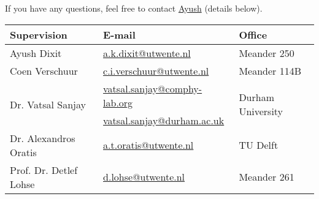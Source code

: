 \documentclass[a4paper,10pt]{article}
\begin{document}
If you have any questions, feel free to contact \href{mailto:a.k.dixit@utwente.nl}{Ayush} (details below).
\begin{center}
\begin{tabular}{|l|l|l|}
\hline \textbf{Supervision} & \textbf{E-mail} & \textbf{Office} \\
\hline Ayush Dixit & \href{mailto:a.k.dixit@utwente.nl}{a.k.dixit@utwente.nl} & Meander 250 \\
\hline Coen Verschuur & \href{mailto:c.i.verschuur@utwente.nl}{c.i.verschuur@utwente.nl} & Meander 114B \\
\hline \multirow{2}{*}{Dr. Vatsal Sanjay} & \href{mailto:vatsal.sanjay@comphy-lab.org}{vatsal.sanjay@comphy-lab.org} & \multirow{2}{*}{Durham University} \\
& \href{mailto:vatsal.sanjay@durham.ac.uk}{vatsal.sanjay@durham.ac.uk} & \\
\hline Dr. Alexandros Oratis   & \href{mailto:a.t.oratis@utwente.nl}{a.t.oratis@utwente.nl}& TU Delft \\
\hline Prof. Dr. Detlef Lohse & \href{mailto:d.lohse@utwente.nl}{d.lohse@utwente.nl} & Meander 261  \\
\hline
\end{tabular}
\end{center}
\printbibliography
\end{document}

